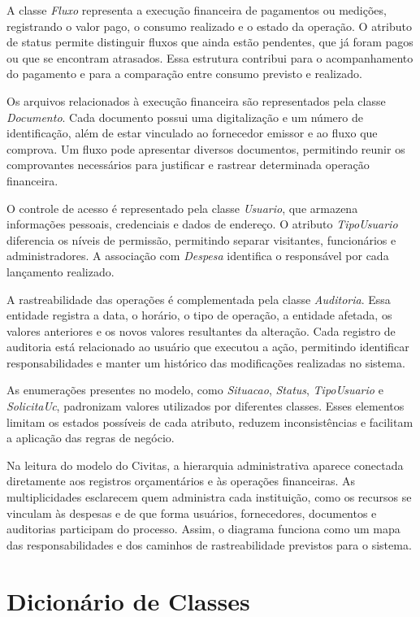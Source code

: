 A classe \textit{Fluxo} representa a execução financeira de pagamentos ou medições, registrando o valor pago, o consumo realizado e o estado da operação. O atributo de status permite distinguir fluxos que ainda estão pendentes, que já foram pagos ou que se encontram atrasados. Essa estrutura contribui para o acompanhamento do pagamento e para a comparação entre consumo previsto e realizado.

Os arquivos relacionados à execução financeira são representados pela classe \textit{Documento}. Cada documento possui uma digitalização e um número de identificação, além de estar vinculado ao fornecedor emissor e ao fluxo que comprova. Um fluxo pode apresentar diversos documentos, permitindo reunir os comprovantes necessários para justificar e rastrear determinada operação financeira.

O controle de acesso é representado pela classe \textit{Usuario}, que armazena informações pessoais, credenciais e dados de endereço. O atributo \textit{TipoUsuario} diferencia os níveis de permissão, permitindo separar visitantes, funcionários e administradores. A associação com \textit{Despesa} identifica o responsável por cada lançamento realizado.

A rastreabilidade das operações é complementada pela classe \textit{Auditoria}. Essa entidade registra a data, o horário, o tipo de operação, a entidade afetada, os valores anteriores e os novos valores resultantes da alteração. Cada registro de auditoria está relacionado ao usuário que executou a ação, permitindo identificar responsabilidades e manter um histórico das modificações realizadas no sistema.

As enumerações presentes no modelo, como \textit{Situacao}, \textit{Status}, \textit{TipoUsuario} e \textit{SolicitaUc}, padronizam valores utilizados por diferentes classes. Esses elementos limitam os estados possíveis de cada atributo, reduzem inconsistências e facilitam a aplicação das regras de negócio.

Na leitura do modelo do Civitas, a hierarquia administrativa aparece conectada diretamente aos registros orçamentários e às operações financeiras. As multiplicidades esclarecem quem administra cada instituição, como os recursos se vinculam às despesas e de que forma usuários, fornecedores, documentos e auditorias participam do processo. Assim, o diagrama funciona como um mapa das responsabilidades e dos caminhos de rastreabilidade previstos para o sistema.

\section{Dicionário de Classes}

